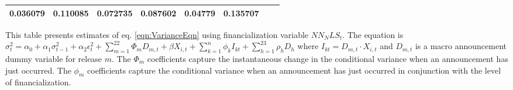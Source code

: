 \begin{sidewaystable}
{\begin{tabular}{@{}lllllllllllll@{}}
0.036079 }                                                 & \multicolumn{2}{c}{ 0.110085 }                                                 & \multicolumn{2}{c}{ 0.072735 }                                                 & \multicolumn{2}{c}{ 0.087602 }                                                 & \multicolumn{2}{c}{ 0.04779 }                                                   & \multicolumn{2}{c}{ 0.135707 }                                                 \\ \bottomrule 
\end{tabular}
}
\begin{tablenotes}\item 
        \singlespacing
        \footnotesize
        This table presents estimates of eq. \ref{eqn:VarianceEqn} using financialization variable $NN_NLS_t$. The equation is $\sigma_{t}^2=\alpha_0+\alpha_1 \sigma_{t-1}^2+\alpha_2 \epsilon_t^2 +\sum_{m=1}^{22} \Phi_m D_{m,t}+\beta X_{i,t}+\sum_{k=1}^n \phi_k I_{kt} + \sum_{h=1}^{23} \rho_h D_h$ where $I_{kt}=D_{m,t} \cdot X_{i,t}$ and $D_{m,t}$ is a macro announcement dummy variable for release $m$. The $\Phi_m$ coefficients capture the instantaneous change in the conditional variance when an announcement has just occurred. The $\phi_m$ coefficients capture the conditional variance when an announcement has just occurred in conjunction with the level of financialization.
\end{tablenotes}
\end{sidewaystable}

